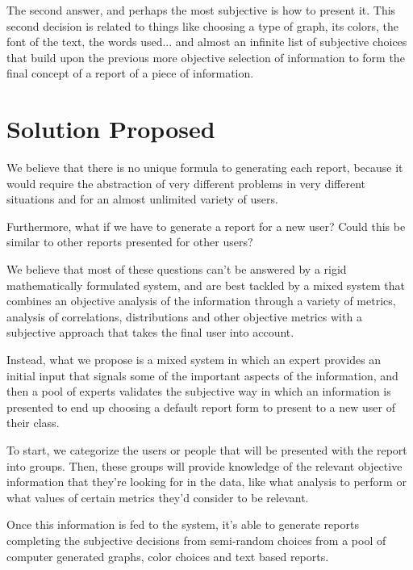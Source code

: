 The second answer, and perhaps the most subjective is how to present it. This second decision is related to things like choosing a type of graph, its colors, the font of the text, the words used... and almost an infinite list of subjective choices that build upon the previous more objective selection of information to form the final concept of a report of a piece of information.

\section{Solution Proposed}
\label{cap1:sec:solution}

We believe that there is no unique formula to generating each report, because it would require the abstraction of very different problems in very different situations and for an almost unlimited variety of users. 

Furthermore, what if we have to generate a report for a new user? Could this be similar to other reports presented for other users? 

We believe that most of these questions can't be answered by a rigid mathematically formulated system, and are best tackled by a mixed system that combines an objective analysis of the information through a variety of metrics, analysis of correlations, distributions and other objective metrics with a subjective approach that takes the final user into account.

Instead, what we propose is a mixed system in which an expert provides an initial input that signals some of the important aspects of the information, and then a pool of experts validates the subjective way in which an information is presented to end up choosing a default report form to present to a new user of their class.

To start, we categorize the users or people that will be presented with the report into groups. Then, these groups will provide knowledge of the relevant objective information that they're looking for in the data, like what analysis to perform or what values of certain metrics they'd consider to be relevant.

Once this information is fed to the system, it's able to generate reports completing the subjective decisions from semi-random choices from a pool of computer generated graphs, color choices and text based reports.

